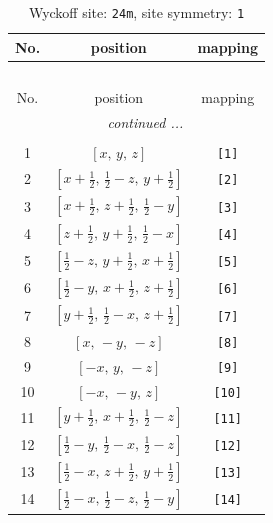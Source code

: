 \documentclass[fleqn,8pt]{jsarticle}
\begin{document}
\begin{longtable}{ccc}
\caption{Wyckoff site: {\tt 24m}, site symmetry: {\tt 1}}
 \\
 \hline \hline
No. & position & mapping \\ \hline \endfirsthead

\multicolumn{2}{l}{\tablename\ \thetable{}} \\
 \hline \hline
No. & position & mapping \\ \hline \endhead

 \hline \hline
\multicolumn{2}{r}{\footnotesize\it continued ...} \\ \endfoot

 \hline \hline
\multicolumn{2}{r}{} \\ \endlastfoot

1 & $\left[ x,\, y,\, z \right]$ & {\tt [1]} \\ \hline
2 & $\left[ x + \frac{1}{2},\, \frac{1}{2} - z,\, y + \frac{1}{2} \right]$ & {\tt [2]} \\ \hline
3 & $\left[ x + \frac{1}{2},\, z + \frac{1}{2},\, \frac{1}{2} - y \right]$ & {\tt [3]} \\ \hline
4 & $\left[ z + \frac{1}{2},\, y + \frac{1}{2},\, \frac{1}{2} - x \right]$ & {\tt [4]} \\ \hline
5 & $\left[ \frac{1}{2} - z,\, y + \frac{1}{2},\, x + \frac{1}{2} \right]$ & {\tt [5]} \\ \hline
6 & $\left[ \frac{1}{2} - y,\, x + \frac{1}{2},\, z + \frac{1}{2} \right]$ & {\tt [6]} \\ \hline
7 & $\left[ y + \frac{1}{2},\, \frac{1}{2} - x,\, z + \frac{1}{2} \right]$ & {\tt [7]} \\ \hline
8 & $\left[ x,\, - y,\, - z \right]$ & {\tt [8]} \\ \hline
9 & $\left[ - x,\, y,\, - z \right]$ & {\tt [9]} \\ \hline
10 & $\left[ - x,\, - y,\, z \right]$ & {\tt [10]} \\ \hline
11 & $\left[ y + \frac{1}{2},\, x + \frac{1}{2},\, \frac{1}{2} - z \right]$ & {\tt [11]} \\ \hline
12 & $\left[ \frac{1}{2} - y,\, \frac{1}{2} - x,\, \frac{1}{2} - z \right]$ & {\tt [12]} \\ \hline
13 & $\left[ \frac{1}{2} - x,\, z + \frac{1}{2},\, y + \frac{1}{2} \right]$ & {\tt [13]} \\ \hline
14 & $\left[ \frac{1}{2} - x,\, \frac{1}{2} - z,\, \frac{1}{2} - y \right]$ & {\tt [14]} \\ \hline

\end{longtable}
\end{document}
